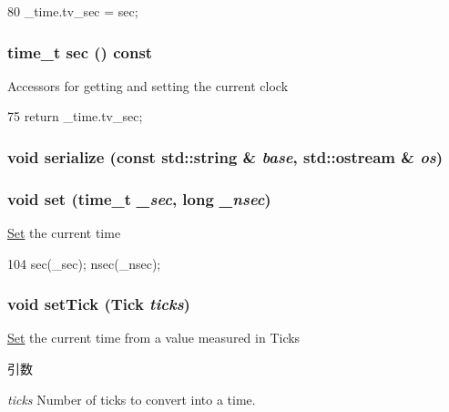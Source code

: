 \begin{DoxyCode}
80 { _time.tv_sec = sec; }
\end{DoxyCode}
\hypertarget{classTime_a423df492eb43ea2116185165099b5266}{
\subsubsection[{sec}]{\setlength{\rightskip}{0pt plus 5cm}time\_\-t sec () const}}
\label{classTime_a423df492eb43ea2116185165099b5266}
Accessors for getting and setting the current clock 


\begin{DoxyCode}
75 { return _time.tv_sec; }
\end{DoxyCode}
\hypertarget{classTime_ab4138b21b48e3371a8e20df72b675a88}{
\subsubsection[{serialize}]{\setlength{\rightskip}{0pt plus 5cm}void serialize (const std::string \& {\em base}, \/  std::ostream \& {\em os})}}
\label{classTime_ab4138b21b48e3371a8e20df72b675a88}
\hypertarget{classTime_a9e8f376bec3e8d15078a9024b0b7e522}{
\subsubsection[{set}]{\setlength{\rightskip}{0pt plus 5cm}void set (time\_\-t {\em \_\-sec}, \/  long {\em \_\-nsec})}}
\label{classTime_a9e8f376bec3e8d15078a9024b0b7e522}
\hyperlink{classSet}{Set} the current time 


\begin{DoxyCode}
104 { sec(_sec); nsec(_nsec); }
\end{DoxyCode}
\hypertarget{classTime_ae71f267ec8d0248b503d266434953239}{
\subsubsection[{setTick}]{\setlength{\rightskip}{0pt plus 5cm}void setTick ({\bf Tick} {\em ticks})}}
\label{classTime_ae71f267ec8d0248b503d266434953239}
\hyperlink{classSet}{Set} the current time from a value measured in Ticks 
\begin{DoxyParams}{引数}
\item[{\em ticks}]Number of ticks to convert into a time. \end{DoxyParams}



